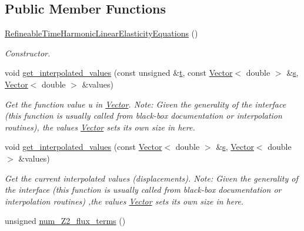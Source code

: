 \subsection*{Public Member Functions}
\begin{DoxyCompactItemize}
\item 
\hyperlink{classoomph_1_1RefineableTimeHarmonicLinearElasticityEquations_a7ff81e939447f97feb032134a7e49605}{Refineable\+Time\+Harmonic\+Linear\+Elasticity\+Equations} ()
\begin{DoxyCompactList}\small\item\em Constructor. \end{DoxyCompactList}\item 
void \hyperlink{classoomph_1_1RefineableTimeHarmonicLinearElasticityEquations_a6e7ba2975f3e6023aebdb877ab0bb7ec}{get\+\_\+interpolated\+\_\+values} (const unsigned \&\hyperlink{cfortran_8h_af6f0bd3dc13317f895c91323c25c2b8f}{t}, const \hyperlink{classoomph_1_1Vector}{Vector}$<$ double $>$ \&\hyperlink{cfortran_8h_ab7123126e4885ef647dd9c6e3807a21c}{s}, \hyperlink{classoomph_1_1Vector}{Vector}$<$ double $>$ \&values)
\begin{DoxyCompactList}\small\item\em Get the function value u in \hyperlink{classoomph_1_1Vector}{Vector}. Note\+: Given the generality of the interface (this function is usually called from black-\/box documentation or interpolation routines), the values \hyperlink{classoomph_1_1Vector}{Vector} sets its own size in here. \end{DoxyCompactList}\item 
void \hyperlink{classoomph_1_1RefineableTimeHarmonicLinearElasticityEquations_aafadd0366ea9fab545ad59f80763d8e7}{get\+\_\+interpolated\+\_\+values} (const \hyperlink{classoomph_1_1Vector}{Vector}$<$ double $>$ \&\hyperlink{cfortran_8h_ab7123126e4885ef647dd9c6e3807a21c}{s}, \hyperlink{classoomph_1_1Vector}{Vector}$<$ double $>$ \&values)
\begin{DoxyCompactList}\small\item\em Get the current interpolated values (displacements). Note\+: Given the generality of the interface (this function is usually called from black-\/box documentation or interpolation routines) ,the values \hyperlink{classoomph_1_1Vector}{Vector} sets its own size in here. \end{DoxyCompactList}\item 
unsigned \hyperlink{classoomph_1_1RefineableTimeHarmonicLinearElasticityEquations_a777cc2db7dc159933afddc073b5f6434}{num\+\_\+\+Z2\+\_\+flux\+\_\+terms} ()

\end{DoxyCompactItemize}
